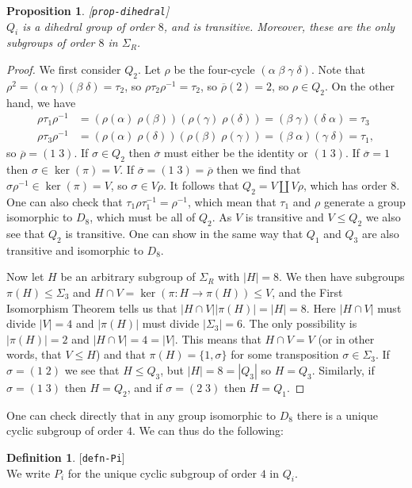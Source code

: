 \documentclass{amsart}
\newcommand{\lbl}[1]{\label{#1}\textup{[\texttt{#1}]}\ \\}
\newcommand{\lbl}{\label}
\newcommand{\al}        {\alpha}
\newcommand{\bt}        {\beta}
\newcommand{\gm}        {\gamma}
\newcommand{\dl}        {\delta}
\newcommand{\sg}        {\sigma}
\newcommand{\Sg}        {\Sigma}
\newcommand{\ov}[1]     {\overline{#1}}
\renewcommand{\:}{\colon}
\newtheorem{proposition}[theorem]{Proposition}
\theoremstyle{definition}
\newtheorem{definition}[theorem]{Definition}
\begin{document}
\begin{proposition}\lbl{prop-dihedral}
 $Q_i$ is a dihedral group of order $8$, and is transitive.  Moreover,
 these are the only subgroups of order $8$ in $\Sg_R$.
\end{proposition}
\begin{proof}
 We first consider $Q_2$.  Let $\rho$ be the four-cycle
 $(\al\;\bt\;\gm\;\dl)$.  Note that
 $\rho^2=(\al\;\gm)(\bt\;\dl)=\tau_2$, so
 $\rho\tau_2\rho^{-1}=\tau_2$, so $\ov{\rho}(2)=2$, so $\rho\in Q_2$.
 On the other hand, we have 
 \begin{align*}
  \rho\tau_1\rho^{-1} &= (\rho(\al)\;\rho(\bt))(\rho(\gm)\;\rho(\dl))
   = (\bt\;\gm)(\dl\;\al) = \tau_3 \\
  \rho\tau_3\rho^{-1} &= (\rho(\al)\;\rho(\dl))(\rho(\bt)\;\rho(\gm))
   = (\bt\;\al)(\gm\;\dl) = \tau_1,
 \end{align*}
 so $\ov{\rho}=(1\;3)$.  If $\sg\in Q_2$ then $\ov{\sg}$ must either
 be the identity or $(1\;3)$.  If $\ov{\sg}=1$ then
 $\sg\in\ker(\pi)=V$.  If $\ov{\sg}=(1\;3)=\ov{\rho}$ then we find
 that $\sg\rho^{-1}\in\ker(\pi)=V$, so $\sg\in V\rho$.  It follows
 that $Q_2=V\amalg V\rho$, which has order $8$.  One can also check
 that $\tau_1\rho\tau_1^{-1}=\rho^{-1}$, which mean that $\tau_1$ and
 $\rho$ generate a group isomorphic to $D_8$, which must be all of
 $Q_2$.  As $V$ is transitive and $V\leq Q_2$ we also see that $Q_2$
 is transitive.  One can show in the same way that $Q_1$ and $Q_3$ are
 also transitive and isomorphic to $D_8$.

 Now let $H$ be an arbitrary subgroup of $\Sg_R$ with $|H|=8$.  We
 then have subgroups $\pi(H)\leq\Sg_3$ and
 $H\cap V=\ker(\pi\:H\to\pi(H))\leq V$, and the First Isomorphism
 Theorem tells us that $|H\cap V||\pi(H)|=|H|=8$.  Here $|H\cap V|$
 must divide $|V|=4$ and $|\pi(H)|$ must divide $|\Sg_3|=6$.  The only
 possibility is $|\pi(H)|=2$ and $|H\cap V|=4=|V|$.  This means that
 $H\cap V=V$ (or in other words, that $V\leq H$) and that
 $\pi(H)=\{1,\sg\}$ for some transposition $\sg\in\Sg_3$.  If
 $\sg=(1\;2)$ we see that $H\leq Q_3$, but $|H|=8=|Q_3|$ so $H=Q_3$.
 Similarly, if $\sg=(1\;3)$ then $H=Q_2$, and if $\sg=(2\;3)$ then
 $H=Q_1$. 
\end{proof}

One can check directly that in any group isomorphic to $D_8$ there is
a unique cyclic subgroup of order $4$.  We can thus do the following:
\begin{definition}\lbl{defn-Pi}
 We write $P_i$ for the unique cyclic subgroup of order $4$ in $Q_i$.
\end{definition}
\end{document}
